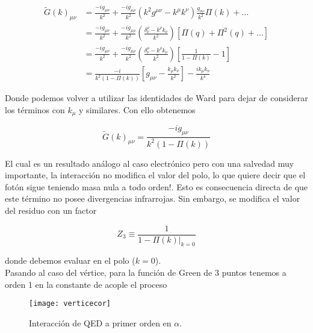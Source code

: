 \documentclass[tickz]{article}
\numberwithin{equation}{section}
\begin{document}
\begin{equation}\label{key}
\begin{aligned}
\widetilde{G}(k)_{\mu\nu} &= \frac{-i g_{\mu\nu}}{k^2} + \frac{-i g_{\mu\rho}}{k^2}\left(k^2g^{\mu\nu} - k^{\mu}k^{\nu}\right) \frac{g_{\sigma\nu}}{k^2} \Pi(k) + \dots\\
&=\frac{-i g_{\mu\nu}}{k^2} + \frac{-i g_{\mu\rho}}{k^2}\left(\frac{\delta^{\rho}_{\nu} - k^{\rho}k_{\nu}}{k^2} \right) \left[ \Pi(q) + \Pi^2(q) + \dots \right]\\
&= \frac{-i g_{\mu\nu}}{k^2} + \frac{-i g_{\mu\rho}}{k^2}\left(\frac{\delta^{\rho}_{\nu} - k^{\rho}k_{\nu}}{k^2} \right) \left[\frac{1}{1 - \Pi(k)} -1 \right]\\
&= \frac{-i}{k^2\left(1-\Pi(k)\right)} \left[g_{\mu\nu} - \frac{k_{\mu}k_{\nu}}{k^2}\right] - \frac{ik_{\mu}k_{\nu}}{k^4}
\end{aligned}
\end{equation}

Donde podemos volver a utilizar las identidades de Ward para dejar de considerar los términos con $ k_{\mu} $ y similares. Con ello obtenemos

\begin{equation}\label{key}
\widetilde{G}(k)_{\mu\nu} = \frac{-ig_{\mu\nu}}{k^2\left(1-\Pi(k)\right)}
\end{equation}

El cual es un resultado análogo al caso electrónico pero con una salvedad muy importante, la interacción no modifica el valor del polo, lo que quiere decir que el fotón sigue teniendo masa nula a todo orden!. Esto es consecuencia directa de que este término no posee divergencias infrarrojas. Sin embargo, se modifica el valor del residuo con un factor

\begin{equation}\label{z3}
Z_3 \equiv \frac{1}{\left. 1-\Pi(k)\right|_{k=0}}
\end{equation}

donde debemos evaluar en el polo ($ k=0 $).\\

Pasando al caso del vértice, para la función de Green de 3 puntos tenemos a orden 1 en la constante de acople el proceso

\begin{figure}[h]
	\centering
	\texttt{[image: verticecor]}
	\caption{Interacción de QED a primer orden en $ \alpha $.}
	\label{fig_vertexcompleto}
\end{figure}
\end{document}
